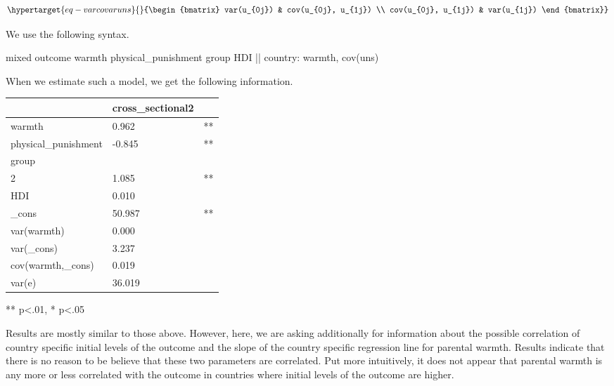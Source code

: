 \documentclass[
  letterpaper,
  DIV=11,
  numbers=noendperiod]{scrreprt}
\newenvironment{Shaded}{\begin{snugshade}}{\end{snugshade}}
\newcommand{\FunctionTok}[1]{\textcolor[rgb]{0.28,0.35,0.67}{#1}}
\newcommand{\NormalTok}[1]{\textcolor[rgb]{0.00,0.23,0.31}{#1}}
\begin{document}
\begin{equation}\protect\hypertarget{eq-varcovaruns}{}{\begin{bmatrix}
var(u_{0j}) & cov(u_{0j}, u_{1j}) \\
cov(u_{0j}, u_{1j}) & var(u_{1j}) 
\end{bmatrix}}\label{eq-varcovaruns}\end{equation}

We use the following syntax.

\begin{Shaded}
\begin{Highlighting}[]

\NormalTok{mixed outcome warmth physical\_punishment }\FunctionTok{group}\NormalTok{ HDI || country: warmth, cov(uns)}
\end{Highlighting}
\end{Shaded}

When we estimate such a model, we get the following information.

\begin{longtable}[]{@{}lll@{}}
\toprule\noalign{}
& cross\_sectional2 & \\
\midrule\noalign{}
\endhead
\bottomrule\noalign{}
\endlastfoot
warmth & 0.962 & ** \\
physical\_punishment & -0.845 & ** \\
group & & \\
2 & 1.085 & ** \\
HDI & 0.010 & \\
\_cons & 50.987 & ** \\
var(warmth) & 0.000 & \\
var(\_cons) & 3.237 & \\
cov(warmth,\_cons) & 0.019 & \\
var(e) & 36.019 & \\
\end{longtable}

** p\textless.01, * p\textless.05

Results are mostly similar to those above. However, here, we are asking
additionally for information about the possible correlation of country
specific initial levels of the outcome and the slope of the country
specific regression line for parental warmth. Results indicate that
there is no reason to be believe that these two parameters are
correlated. Put more intuitively, it does not appear that parental
warmth is any more or less correlated with the outcome in countries
where initial levels of the outcome are higher.
\end{document}

